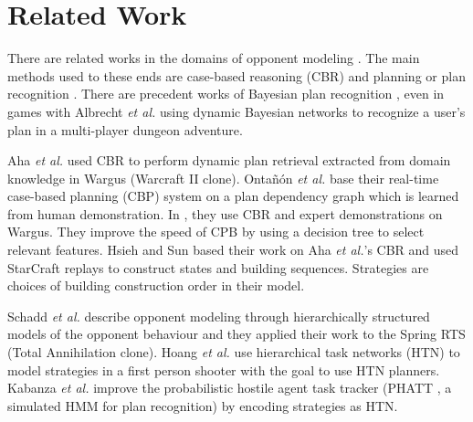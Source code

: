 \section{Related Work}


\citep{Weber2010qf} 

There are related works in the domains of opponent modeling \citep{HsiehS08,schadd2007opponent,OBRecog}. The main methods used to these ends are case-based reasoning (CBR) and planning or plan recognition \citep{LTW,CBR_Planning,OntanonCBR,HTNPlanning,Ramirez}. There are precedent works of Bayesian plan recognition \citep{BMPR}, even in games with Albrecht \textit{et al.} \citep{BayesianRecog} using dynamic Bayesian networks to recognize a user's plan in a multi-player dungeon adventure. 

Aha \textit{et al.} \citep{LTW} used CBR to perform dynamic plan retrieval extracted from domain knowledge in Wargus (Warcraft II clone). Onta\~{n}\'{o}n \textit{et al.} \citep{CBR_Planning} base their real-time case-based planning (CBP) system on a plan dependency graph which is learned from human demonstration. In \citep{OntanonCBR,PlanRetrieval}, they use CBR and expert demonstrations on Wargus. %
They improve the speed of CPB by using a decision tree to select relevant features. Hsieh and Sun \citep{HsiehS08} based their work on Aha \textit{et al.}'s CBR \citep{LTW} and used StarCraft replays to construct states and building sequences. Strategies are choices of building construction order in their model. 

Schadd \textit{et al.} \citep{schadd2007opponent} describe opponent modeling through hierarchically structured models of the opponent behaviour and they applied their work to the Spring RTS (Total Annihilation clone). Hoang \textit{et al.} \citep{HTNPlanning} use hierarchical task networks (HTN) to model strategies in a first person shooter with the goal to use HTN planners. Kabanza \textit{et al.} \citep{OBRecog} improve the probabilistic hostile agent task tracker (PHATT \citep{PHATT}, a simulated HMM for plan recognition) by encoding strategies as HTN. 

